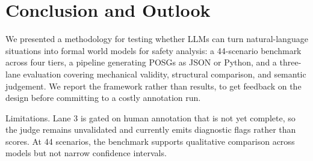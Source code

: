 \documentclass{article}
\begin{document}






\section{Conclusion and Outlook}
\label{sec:conclusion}

We presented a methodology for testing whether LLMs can turn natural-language situations into formal world models for safety analysis: a 44-scenario benchmark across four tiers, a pipeline generating POSGs as JSON or Python, and a three-lane evaluation covering mechanical validity, structural comparison, and semantic judgement. We report the framework rather than results, to get feedback on the design before committing to a costly annotation run.

Limitations. Lane 3 is gated on human annotation that is not yet complete, so the judge remains unvalidated and currently emits diagnostic flags rather than scores. At 44 scenarios, the benchmark supports qualitative comparison across models but not narrow confidence intervals.
\end{document}
